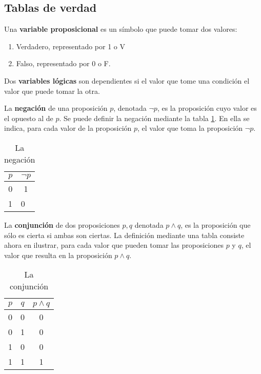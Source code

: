 \subsection{Tablas de verdad}

Una \textbf{variable proposicional} es un símbolo que puede tomar
dos valores:
\begin{enumerate}
	\item Verdadero, representado por 1 o V
	\item Falso, representado por 0 o F.
\end{enumerate}

Dos \textbf{variables lógicas} son dependientes si el valor
que tome una condición el valor que puede tomar la otra.

\begin{definition}[Negación]
	La \textbf{negación} de una proposición $p$, denotada $\lnot p$, es la proposición cuyo valor es el opuesto al de $p$.
	Se puede definir la negación mediante la  tabla \ref{tabfmc2}. En ella se indica,
	para cada valor de la proposición $p$, el valor que toma la proposición $\lnot p$.
\end{definition}

\begin{table}[h!]
	\centering
	\begin{tabular}{|c|c|}
		\hline
		$p$                     & $\lnot p$               \\ \hline
		0                       & 1                       \\ \hline
		\multicolumn{1}{|l|}{1} & \multicolumn{1}{|l|}{0} \\ \hline
	\end{tabular}
	\caption{La negación}
	\label{tabfmc2}
\end{table}

\begin{definition}[Conjunción]
	La \textbf{conjunción} de dos proposiciones $p, q$ denotada $p \wedge q$, es la
	proposición que sólo es cierta si ambas son ciertas.
	La definición mediante una tabla consiste ahora en ilustrar, para cada valor
	que pueden tomar las proposiciones $p$ y $q$, el valor que resulta en la proposición
	$p \wedge q$.
\end{definition}


\begin{table}[h!]
	\centering
	\begin{tabular}{|c|c|c|}
		\hline
		$p$ & $q$ & $p \wedge q$ \\ \hline
		0   & 0   & 0            \\ \hline
		0   & 1   & 0            \\ \hline
		1   & 0   & 0            \\ \hline
		1   & 1   & 1            \\ \hline
	\end{tabular}
	\caption{La conjunción}
	\label{tabfmc3}
\end{table}

